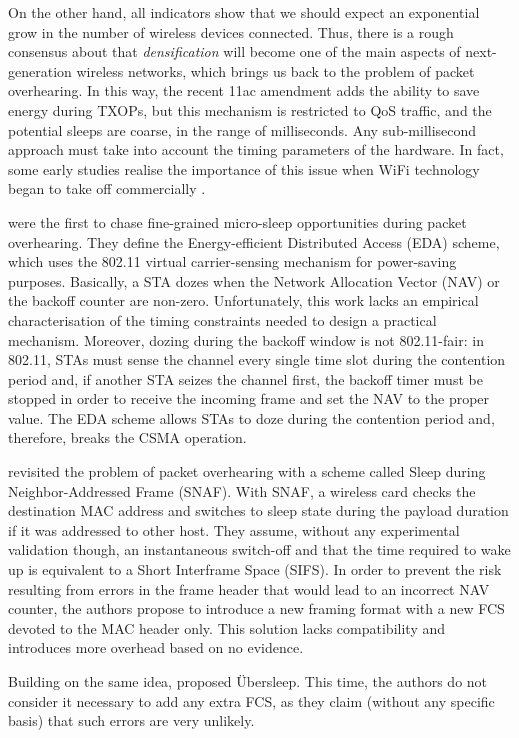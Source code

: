 \documentclass[twoside,nohyper]{tufte-book}
\theoremstyle{definition}
\theoremstyle{definition}
\theoremstyle{definition}
\theoremstyle{remark}
\begin{document}
On the other hand, all indicators show that we should expect an
exponential grow in the number of wireless devices connected. Thus,
there is a rough consensus about that \emph{densification} will become
one of the main aspects of next-generation wireless networks, which
brings us back to the problem of packet overhearing. In this way, the
recent 11ac amendment adds the ability to save energy during TXOPs, but
this mechanism is restricted to QoS traffic, and the potential sleeps
are coarse, in the range of milliseconds. Any sub-millisecond approach
must take into account the timing parameters of the hardware. In fact,
some early studies realise the importance of this issue when WiFi
technology began to take off commercially
\citep{kamerman1997, havinga2000, jung2002}.

\citet{Baiamonte2006} were the first to chase fine-grained micro-sleep
opportunities during packet overhearing. They define the
Energy-efficient Distributed Access (EDA) scheme, which uses the 802.11
virtual carrier-sensing mechanism for power-saving purposes. Basically,
a STA dozes when the Network Allocation Vector (NAV) or the backoff
counter are non-zero. Unfortunately, this work lacks an empirical
characterisation of the timing constraints needed to design a practical
mechanism. Moreover, dozing during the backoff window is not
802.11-fair: in 802.11, STAs must sense the channel every single time
slot during the contention period and, if another STA seizes the channel
first, the backoff timer must be stopped in order to receive the
incoming frame and set the NAV to the proper value. The EDA scheme
allows STAs to doze during the contention period and, therefore, breaks
the CSMA operation.

\citet{Balaji2010} revisited the problem of packet overhearing with a
scheme called Sleep during Neighbor-Addressed Frame (SNAF). With SNAF, a
wireless card checks the destination MAC address and switches to sleep
state during the payload duration if it was addressed to other host.
They assume, without any experimental validation though, an
instantaneous switch-off and that the time required to wake up is
equivalent to a Short Interframe Space (SIFS). In order to prevent the
risk resulting from errors in the frame header that would lead to an
incorrect NAV counter, the authors propose to introduce a new framing
format with a new FCS devoted to the MAC header only. This solution
lacks compatibility and introduces more overhead based on no evidence.

Building on the same idea, \citet{Prasad2014} proposed Übersleep. This
time, the authors do not consider it necessary to add any extra FCS, as
they claim (without any specific basis) that such errors are very
unlikely.
\end{document}
